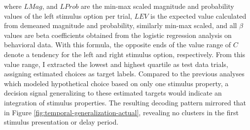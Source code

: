 where $LMag$, and $LProb$ are the min-max scaled magnitude and probability values of the left stimulus option per trial, $LEV$ is the expected value calculated from demeaned magnitude and probability, similarly min-max scaled, and all $\beta$ values are beta coefficients obtained from the logistic regression analysis on behavioral data.
With this formula, the opposite ends of the value range of $C$ denote a tendency for the left and right stimulus option, respectively.
From this value range, I extracted the lowest and highest quartile as test data trials, assigning estimated choices as target labels.
Compared to the previous analyses which modeled hypothetical choice based on only one stimulus property, a decision signal generalizing to these estimated targets would indicate an integration of stimulus properties.
The resulting decoding pattern mirrored that in Figure \ref{fig:temporal-generalization-actual}, revealing no clusters in the first stimulus presentation or delay period.


